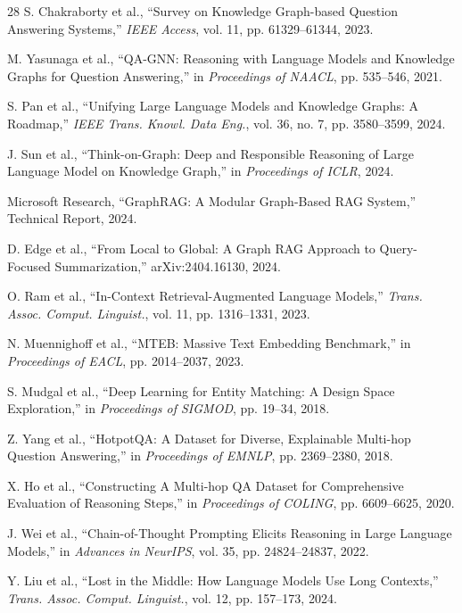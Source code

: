 \documentclass[conference]{IEEEtran}
\begin{document}
\begin{thebibliography}{28}
S. Chakraborty et al., ``Survey on Knowledge Graph-based Question Answering Systems,'' \textit{IEEE Access}, vol. 11, pp. 61329--61344, 2023.

M. Yasunaga et al., ``QA-GNN: Reasoning with Language Models and Knowledge Graphs for Question Answering,'' in \textit{Proceedings of NAACL}, pp. 535--546, 2021.

S. Pan et al., ``Unifying Large Language Models and Knowledge Graphs: A Roadmap,'' \textit{IEEE Trans. Knowl. Data Eng.}, vol. 36, no. 7, pp. 3580--3599, 2024.

J. Sun et al., ``Think-on-Graph: Deep and Responsible Reasoning of Large Language Model on Knowledge Graph,'' in \textit{Proceedings of ICLR}, 2024.

Microsoft Research, ``GraphRAG: A Modular Graph-Based RAG System,'' Technical Report, 2024.

D. Edge et al., ``From Local to Global: A Graph RAG Approach to Query-Focused Summarization,'' arXiv:2404.16130, 2024.

O. Ram et al., ``In-Context Retrieval-Augmented Language Models,'' \textit{Trans. Assoc. Comput. Linguist.}, vol. 11, pp. 1316--1331, 2023.

N. Muennighoff et al., ``MTEB: Massive Text Embedding Benchmark,'' in \textit{Proceedings of EACL}, pp. 2014--2037, 2023.

S. Mudgal et al., ``Deep Learning for Entity Matching: A Design Space Exploration,'' in \textit{Proceedings of SIGMOD}, pp. 19--34, 2018.

Z. Yang et al., ``HotpotQA: A Dataset for Diverse, Explainable Multi-hop Question Answering,'' in \textit{Proceedings of EMNLP}, pp. 2369--2380, 2018.

X. Ho et al., ``Constructing A Multi-hop QA Dataset for Comprehensive Evaluation of Reasoning Steps,'' in \textit{Proceedings of COLING}, pp. 6609--6625, 2020.

J. Wei et al., ``Chain-of-Thought Prompting Elicits Reasoning in Large Language Models,'' in \textit{Advances in NeurIPS}, vol. 35, pp. 24824--24837, 2022.

Y. Liu et al., ``Lost in the Middle: How Language Models Use Long Contexts,'' \textit{Trans. Assoc. Comput. Linguist.}, vol. 12, pp. 157--173, 2024.


\end{thebibliography}
\end{document}
